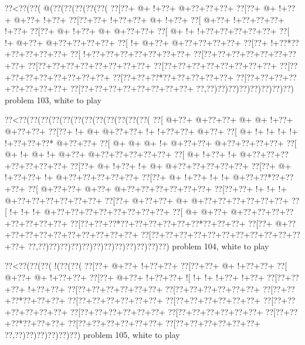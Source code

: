 \vbox{\vbox{\goo
\0??<\0??(\0??(\- @(\0??(\0??(\0??(\0??(\0??(
\0??[\0??+\- @+\- !+\0??+\- @+\0??+\0??+\0??+
\0??[\0??+\- @+\- !+\0??+\- @+\0??+\- !+\0??+
\0??[\0??+\0??+\- !+\0??+\0??+\- @+\- !+\0??+
\0??[\- @+\0??+\- !+\0??+\0??+\0??+\- !+\0??+
\0??[\0??+\- @+\- !+\0??+\- @+\- @+\0??+\0??+
\0??[\- @+\- !+\- !+\0??+\0??+\0??+\0??+\0??+
\0??[\- !+\- @+\0??+\- @+\0??+\0??+\0??+\0??+
\0??[\- !+\- @+\0??+\- @+\0??+\0??+\0??+\0??+
\0??[\0??+\- !+\0??*\0??+\0??+\0??+\0??+\0??+
\0??[\- !+\0??+\0??+\0??+\0??+\0??+\0??+\0??+
\0??[\0??+\0??+\0??+\0??+\0??+\0??+\0??+\0??+
\0??[\0??+\0??+\0??+\0??+\0??+\0??+\0??+\0??+
\0??[\0??+\0??+\0??+\0??+\0??+\0??+\0??+\0??+
\0??[\0??+\0??+\0??+\0??+\0??+\0??+\0??+\0??+
\0??[\0??+\0??+\0??*\0??+\0??+\0??+\0??+\0??+
\0??[\0??+\0??+\0??+\0??+\0??+\0??+\0??+\0??+
\0??[\0??+\0??+\0??+\0??+\0??+\0??+\0??+\0??+
\0??,\0??)\0??)\0??)\0??)\0??)\0??)\0??)\0??)
}
\hfil problem 103, white to play\hfil\break
}

\vbox{\vbox{\goo
\0??<\0??(\0??(\0??(\0??(\0??(\0??(\0??(\0??(\0??(\0??(\0??(\0??(
\0??[\- @+\0??+\- @+\0??+\0??+\- @+\- @+\- !+\0??+\- @+\0??+\0??+
\0??[\0??+\- !+\- @+\- @+\0??+\0??+\- !+\- !+\0??+\0??+\- @+\0??+
\0??[\- @+\- !+\- !+\- !+\- !+\- !+\0??+\0??+\0??*\- @+\0??+\0??+
\0??[\- @+\- @+\- @+\- !+\- @+\0??+\0??+\- @+\0??+\0??+\0??+\0??+
\0??[\- @+\- !+\- @+\- !+\- @+\0??+\- @+\0??+\0??+\0??+\0??+\0??+
\0??[\- @+\- !+\0??+\- !+\- @+\0??+\0??+\0??+\0??+\0??+\0??+\0??+
\0??[\0??+\- @+\- !+\0??+\- !+\- @+\- @+\0??+\0??+\0??+\0??+\0??+
\0??[\0??+\- @+\- !+\0??+\0??+\- !+\- @+\0??+\0??+\0??+\0??+\0??+
\0??[\0??+\- @+\- !+\0??+\- !+\- !+\- @+\0??+\0??*\0??+\0??+\0??+
\0??[\- @+\0??+\0??+\- @+\0??+\- @+\0??+\0??+\0??+\0??+\0??+\0??+
\0??[\0??+\0??+\- !+\- !+\- !+\- @+\0??+\0??+\0??+\0??+\0??+\0??+
\0??[\0??+\- @+\0??+\0??+\- @+\- @+\0??+\0??+\0??+\0??+\0??+\0??+
\0??[\- !+\- !+\- !+\- @+\0??+\0??+\0??+\0??+\0??+\0??+\0??+\0??+
\0??[\- @+\- @+\0??+\- @+\0??+\0??+\0??+\0??+\0??+\0??+\0??+\0??+
\0??[\0??+\0??+\0??*\0??+\0??+\0??+\0??+\0??+\0??*\0??+\0??+\0??+
\0??[\0??+\- @+\0??+\0??+\0??+\0??+\0??+\0??+\0??+\0??+\0??+\0??+
\0??[\0??+\0??+\0??+\0??+\0??+\0??+\0??+\0??+\0??+\0??+\0??+\0??+
\0??,\0??)\0??)\0??)\0??)\0??)\0??)\0??)\0??)\0??)\0??)\0??)\0??)
}
\hfil problem 104, white to play\hfil\break
}

\vbox{\vbox{\goo
\0??<\0??(\0??(\0??(\- !(\0??(\0??(
\0??[\0??+\- @+\0??+\- !+\0??+\0??+
\0??[\0??+\0??+\- @+\- !+\0??+\0??+
\0??[\- @+\0??+\- @+\- !+\0??+\0??+
\0??[\0??+\- @+\0??+\- !+\0??+\0??+
\- ![\- !+\- !+\- !+\0??+\- !+\0??+
\0??[\0??+\0??+\0??+\- !+\0??+\0??+
\0??[\0??+\0??+\0??+\0??+\0??+\0??+
\0??[\0??+\0??+\0??+\0??+\0??+\0??+
\0??[\0??+\0??+\0??*\0??+\0??+\0??+
\0??[\0??+\0??+\0??+\0??+\0??+\0??+
\0??[\0??+\0??+\0??+\0??+\0??+\0??+
\0??[\0??+\0??+\0??+\0??+\0??+\0??+
\0??[\0??+\0??+\0??+\0??+\0??+\0??+
\0??[\0??+\0??+\0??+\0??+\0??+\0??+
\0??[\0??+\0??+\0??*\0??+\0??+\0??+
\0??[\0??+\0??+\0??+\0??+\0??+\0??+
\0??[\0??+\0??+\0??+\0??+\0??+\0??+
\0??,\0??)\0??)\0??)\0??)\0??)\0??)
}
\hfil problem 105, white to play\hfil\break
}

